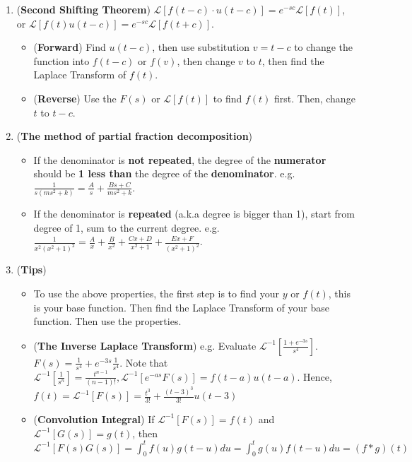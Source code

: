 \documentclass[10pt, landscape]{article}
\begin{document}
\begin{multicols}{4}
\begin{enumerate}
        \item (\textbf{Second Shifting Theorem}) $\mathcal{L}[f(t-c)\cdot u(t-c)]=e^{-sc}\mathcal{L}[f(t)]$, or $\mathcal{L}[f(t)u(t-c)]=e^{-sc}\mathcal{L}[f(t+c)]$.
    \begin{itemize}
        \item (\textbf{Forward}) Find $u(t-c)$, then use substitution $v=t-c$ to change the function into $f(t-c)\text{ or }f(v)$, then change $v$ to $t$, then find the Laplace Transform of $f(t)$.
        \item (\textbf{Reverse}) Use the $F(s) \text{ or } \mathcal{L}[f(t)]$ to find $f(t)$ first. Then, change $t$ to $t-c$.
    \end{itemize}
    \item (\textbf{The method of partial fraction decomposition})
    \begin{itemize}
        \item If the denominator is \textbf{not repeated}, the degree of the \textbf{numerator} should be \textbf{1 less than} the degree of the \textbf{denominator}. e.g. $\frac{1}{s(ms^2+k)}=\frac{A}{s}+\frac{Bs+C}{ms^2+k}$.
        \item If the denominator is \textbf{repeated} (a.k.a degree is bigger than 1), start from degree of 1, sum to the current degree. e.g. $\frac{1}{x^2(x^2+1)^2}=\frac{A}{x}+\frac{B}{x^2}+\frac{Cx+D}{x^2+1}+\frac{Ex+F}{(x^2+1)^2}$.
    \end{itemize}
    \item (\textbf{Tips})
    \begin{itemize}
        \item To use the above properties, the first step is to find your $y\text{ or }f(t)$, this is your base function. Then find the Laplace Transform of your base function. Then use the properties.
        \item (\textbf{The Inverse Laplace Transform}) e.g. Evaluate $\mathcal{L}^{-1}[\frac{1+e^{-3s}}{s^4}]$. $F(s)=\frac{1}{s^4}+e^{-3s}\frac{1}{s^4}$. Note that $\mathcal{L}^{-1}[\frac{1}{s^n}]=\frac{t^{n-1}}{(n-1)!}, \mathcal{L}^{-1}[e^{-as}F(s)]=f(t-a)u(t-a)$. Hence, $f(t)=\mathcal{L}^{-1}[F(s)]=\frac{t^3}{3!}+\frac{(t-3)^3}{3!}u(t-3)$
        \item (\textbf{Convolution Integral}) If $\mathcal{L}^{-1}[F(s)]=f(t)$ and $\mathcal{L}^{-1}[G(s)]=g(t)$, then $\mathcal{L}^{-1}[F(s)G(s)]=\int_0^tf(u)g(t-u)du=\int_0^tg(u)f(t-u)du=(f*g)(t)$
    \end{itemize}
\end{enumerate}

\end{multicols}
\end{document}
